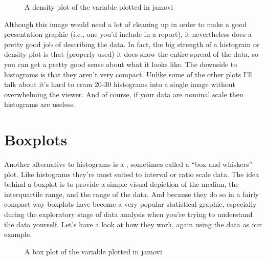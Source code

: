 \begin{figure}[ht]
\begin{center}
\caption{A density plot of the  variable plotted in jamovi}
\label{fig:histogram2}
\HR
\end{center}
\end{figure}

Although this image would need a lot of cleaning up in order to make a good presentation graphic (i.e., one you'd include in a report), it nevertheless does a pretty good job of describing the data. In fact, the big strength of a histogram or density plot is that (properly used) it does show the entire spread of the data, so you can get a pretty good sense about what it looks like. The downside to histograms is that they aren't very compact. Unlike some of the other plots I'll talk about it's hard to cram 20-30 histograms into a single image without overwhelming the viewer. And of course, if your data are nominal scale then histograms are useless.


\section{Boxplots~\label{sec:boxplots}}

Another alternative to histograms is a , sometimes called a ``box and whiskers'' plot. Like histograms they're most suited to interval or ratio scale data. The idea behind a boxplot is to provide a simple visual depiction of the median, the interquartile range, and the range of the data. And because they do so in a fairly compact way boxplots have become a very popular statistical graphic, especially during the exploratory stage of data analysis when you're trying to understand the data yourself. Let's have a look at how they work, again using the  data as our example.

\begin{figure}[!!htb]
\begin{center}
\caption{A box plot of the  variable plotted in jamovi}
\label{fig:boxplot1}
\HR
\end{center}
\end{figure}
 
